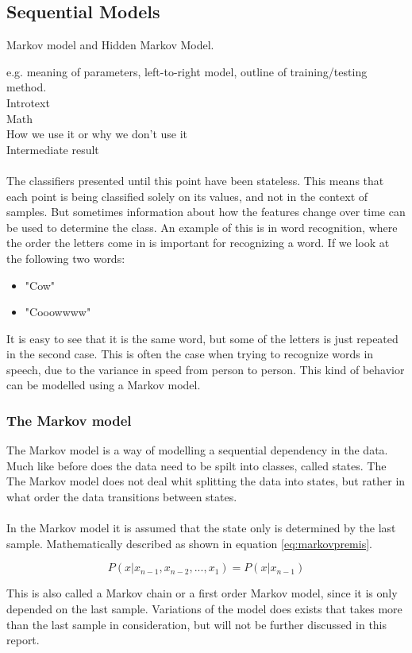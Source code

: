 \subsection{Sequential Models}
Markov model and Hidden Markov Model.

e.g. meaning of parameters, left-to-right model, outline of training/testing method.\\

Introtext\\

Math\\

How we use it or why we don't use it\\

Intermediate result\\\ \\


The classifiers presented until this point have been stateless. This means that each point is being classified solely on its values, and not in the context of samples. But sometimes information about how the features change over time can be used to determine the class. An example of this is in word recognition, where the order the letters come in is important for recognizing a word.  If we look at the following two words:

\begin{itemize}
  \item "Cow"
  \item "Cooowwww"
\end{itemize}

It is easy to see that it is the same word, but some of the letters is just repeated in the second case. This is often the case when trying to recognize words in speech, due to the variance in speed from person to person. This kind of behavior  can be modelled using a Markov model.

\subsubsection{The Markov model}
The Markov model is a way of modelling a sequential dependency in the data. Much like before does the data need to be spilt into classes, called states. The The Markov model does not deal whit splitting the data into states, but rather in what order the data transitions between states.\\\ \\

In the Markov model it is assumed that the state only is determined by the last sample. Mathematically described as shown in equation \ref{eq:markovpremis}.

\begin{equation}
 P(x| x_{n-1}, x_{n-2}, ..., x_1) = P(x| x_{n-1}) 
 \label{eq:markovpremis}
\end{equation}

This is also called a Markov chain or a first order Markov model, since it is only depended on the last sample. Variations of the model does exists that takes more than the last sample in consideration, but will not be further discussed in this report.  

